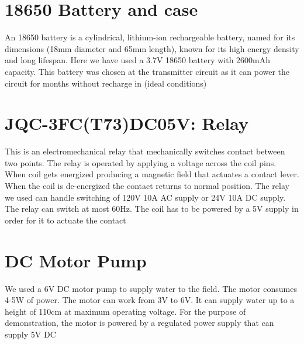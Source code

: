 \newpage

\section{18650 Battery and case}


An 18650 battery is a cylindrical, lithium-ion rechargeable battery,
named for its dimensions (18mm diameter and 65mm length), known for
its high energy density and long lifespan. Here we have used a 3.7V
18650 battery with 2600mAh capacity. This battery was chosen at the
transmitter circuit as it can power the circuit for months without
recharge in (ideal conditions)

\vspace*{1cm}

\section{JQC-3FC(T73)DC05V: Relay}

\setlength{\columnsep}{.3cm}

This is an electromechanical relay that mechanically switches contact
between two points. The relay is operated by applying a voltage
across the coil pins. When coil gets energized producing a magnetic
field that actuates a contact lever. When the coil is de-energized
the contact returns to normal position. The relay we used can handle
switching of 120V 10A AC supply or 24V 10A DC supply. The relay can
switch at most 60Hz. The coil has to be powered by a 5V supply in
order for it to actuate the contact

\section{DC Motor Pump}


We used a 6V DC motor pump to supply water to the field. The motor
consumes 4-5W of power. The motor can work from 3V to 6V. It can
supply water up to a height of 110cm at maximum operating voltage.
For the purpose of demonstration, the motor is powered by a regulated
power supply that can supply 5V DC

\vspace*{1cm}

